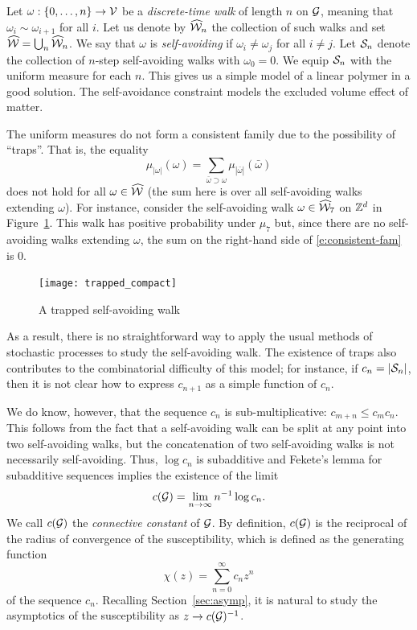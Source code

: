 \begin{example}
Let $\omega : \{0,\ldots,n\} \rightarrow \mathcal{V}$ be a \emph{discrete-time walk}
of length $n$ on $\mathcal{G}$, meaning that $\omega_i \sim \omega_{i+1}$ for all $i$. Let us
denote by $\widehat{\mathcal{W}}_n$ the collection of such walks and set $\widehat{\mathcal{W}} = \bigcup_n \widehat{\mathcal{W}}_n$.
We say that $\omega$ is \emph{self-avoiding} if $\omega_i \ne \omega_j$
for all $i \ne j$. Let $\mathcal{S}_n$ denote the collection of $n$-step
self-avoiding walks with $\omega_0 = 0$. We equip $\mathcal{S}_n$ with the uniform
measure for each $n$. This gives us a simple model of a linear polymer in a good
solution. The self-avoidance constraint models the excluded volume effect of matter.

The uniform measures do not form a consistent family due to the possibility of ``traps''.
That is, the equality
\begin{equation}
\label{e:consistent-fam}
\mu_{|\omega|}(\omega) = \sum_{\bar\omega \supset \omega} \mu_{|\bar\omega|}(\bar\omega)
\end{equation}
does not hold for all $\omega\in\widehat{\mathcal{W}}$ (the sum here is over all self-avoiding walks extending $\omega$).
For instance, consider the self-avoiding walk $\omega\in\widehat{\mathcal{W}}_7$
on ${ {{\mathbb Z}}^d }$ in Figure~\ref{fig:trap}. This walk has positive probability under $\mu_7$ but,
since there are no self-avoiding walks extending $\omega$, the sum on the 
right-hand side of \eqref{e:consistent-fam} is $0$.

\begin{figure}[!htb]
\label{fig:trap}
\centering
\texttt{[image: trapped\_compact]}
\caption[Trapped SAW]{A trapped self-avoiding walk}
\end{figure}

As a result, there is no straightforward way to apply the usual methods of stochastic processes
to study the self-avoiding walk. The existence of traps also contributes to the
combinatorial difficulty of this model; for instance, if $c_n = |\mathcal{S}_n|$, then it is
not clear how to express $c_{n+1}$ as a simple function of $c_n$.

We do know, however, that the sequence $c_n$ is sub-multiplicative: $c_{m+n} \le c_m c_n$.
This follows from the fact that a self-avoiding walk can be split at any point into two
self-avoiding walks, but the concatenation of two self-avoiding walks is not
necessarily self-avoiding. Thus, $\log c_n$ is subadditive and
Fekete's lemma for subadditive sequences implies the existence of the limit
\begin{equation}
c(\mathcal{G}) = \lim_{n\rightarrow\infty} n^{-1} \log c_n.
\end{equation}
We call $c(\mathcal{G})$ the \emph{connective constant} of $\mathcal{G}$.
By definition, $c(\mathcal{G})$ is the reciprocal of the radius of convergence of the susceptibility,
which is defined as the generating function
\begin{equation}
\chi(z) = \sum_{n=0}^\infty c_n z^n
\end{equation}
of the sequence $c_n$. Recalling Section~\ref{sec:asymp}, it is natural to study
the asymptotics of the susceptibility as $z \rightarrow c(\mathcal{G})^{-1}$.
\end{example}

